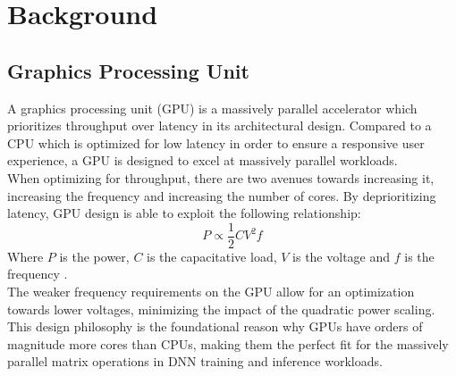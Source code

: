 \chapter{Background}\label{chap:background}




\section{Graphics Processing Unit}
A graphics processing unit (GPU) is a massively parallel accelerator which prioritizes throughput over latency in its architectural design. Compared to a CPU which is optimized for low latency in order to ensure a responsive user  experience, a GPU is designed to excel at massively parallel workloads. \\
When optimizing for throughput, there are two avenues towards increasing it, increasing the frequency and increasing the number of cores. By deprioritizing latency, GPU design is able to exploit the following relationship:
\begin{equation}
    P \propto \frac{1}{2} C V^2 f
\end{equation}
Where $P$ is the power, $C$ is the capacitative load, $V$ is the voltage and $f$ is the frequency \cite{hennessy2017computer}. \\
The weaker frequency requirements on the GPU allow for an optimization towards lower voltages, minimizing the impact of the quadratic power scaling. \\
This design philosophy is the foundational reason why GPUs have orders of magnitude more cores than CPUs, making them the perfect fit for the massively parallel matrix operations in DNN training and inference workloads.








